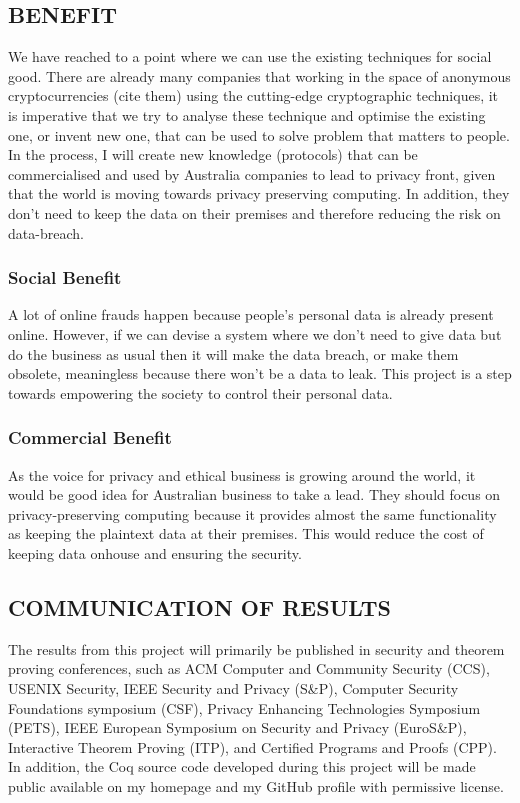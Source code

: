 \documentclass[12pt,a4paper]{article}
\begin{document}
\subsection*{BENEFIT}
 We have reached to a point where we can use the existing techniques for social good. 
 There are already many companies that working in the space of anonymous cryptocurrencies (cite them) 
 using the cutting-edge cryptographic techniques, it is imperative that we 
 try to analyse these technique and optimise the existing one, or invent new one, 
 that can be used to solve problem that matters to people. In the process, 
 I will create new knowledge (protocols) that can be commercialised and used 
 by Australia companies to lead to privacy front, given that the world 
 is moving towards privacy preserving computing. In addition, 
 they don't need to keep the data on their premises and therefore 
 reducing the risk on data-breach. 


\subsubsection{Social Benefit}
  A lot of online frauds happen because people's personal data is already present 
  online. However, if we can devise a system where we don't need to give data 
  but do the business as usual then it will make the data breach, or make them 
  obsolete, meaningless because there won't be a data to leak. This project 
  is a step towards empowering the society to control their 
  personal data. 

\subsubsection{Commercial Benefit}
  As the voice for privacy and ethical business is growing around the world, 
  it would be good idea for Australian business to take a lead. They should 
  focus on privacy-preserving computing because it provides almost 
  the same functionality as keeping the plaintext data at their premises. 
  This would reduce the cost of keeping data onhouse and ensuring 
  the security. 




\subsection*{COMMUNICATION OF RESULTS}
The results from this project will primarily be published in security and theorem proving conferences, 
such as ACM Computer and Community Security (CCS), USENIX Security, IEEE Security and Privacy (S\&P), 
Computer Security Foundations symposium (CSF), Privacy Enhancing Technologies Symposium (PETS),
IEEE European Symposium on Security and Privacy (EuroS\&P), Interactive Theorem Proving (ITP),
and Certified Programs and Proofs (CPP). In addition, the Coq source code developed during this project 
will be made public available on my homepage and my GitHub profile with permissive license. 
\end{document}
